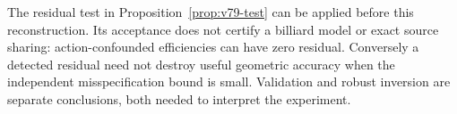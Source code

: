 The residual test in Proposition~\ref{prop:v79-test} can be applied
before this reconstruction.  Its acceptance does not certify a billiard
model or exact source sharing: action-confounded efficiencies can have
zero residual.  Conversely a detected residual need not destroy useful
geometric accuracy when the independent misspecification bound is small.
Validation and robust inversion are separate conclusions, both needed
to interpret the experiment.
